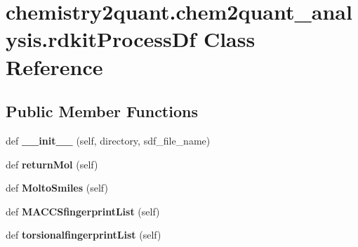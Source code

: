 \hypertarget{classchemistry2quant_1_1chem2quant__analysis_1_1rdkitProcessDf}{}\section{chemistry2quant.\+chem2quant\+\_\+analysis.\+rdkit\+Process\+Df Class Reference}
\label{classchemistry2quant_1_1chem2quant__analysis_1_1rdkitProcessDf}
\subsection*{Public Member Functions}
\begin{DoxyCompactItemize}
\item 
\mbox{\label{classchemistry2quant_1_1chem2quant__analysis_1_1rdkitProcessDf_a3f2db3306c1c8c1883cf3af811c539bf}} 
def {\bfseries \+\_\+\+\_\+init\+\_\+\+\_\+} (self, directory, sdf\+\_\+file\+\_\+name)
\item 
\mbox{\label{classchemistry2quant_1_1chem2quant__analysis_1_1rdkitProcessDf_a63adf77432f5f20cb2e80f8860f67c79}} 
def {\bfseries return\+Mol} (self)
\item 
\mbox{\label{classchemistry2quant_1_1chem2quant__analysis_1_1rdkitProcessDf_a201597882ae98a081f023159382c7d05}} 
def {\bfseries Molto\+Smiles} (self)
\item 
\mbox{\label{classchemistry2quant_1_1chem2quant__analysis_1_1rdkitProcessDf_a83bba1c97ce582a8714cb142edfcfa47}} 
def {\bfseries M\+A\+C\+C\+Sfingerprint\+List} (self)
\item 
\mbox{\label{classchemistry2quant_1_1chem2quant__analysis_1_1rdkitProcessDf_a6d041ac510600067d5f690a29ab1efb8}} 
def {\bfseries torsionalfingerprint\+List} (self)
\end{DoxyCompactItemize}
